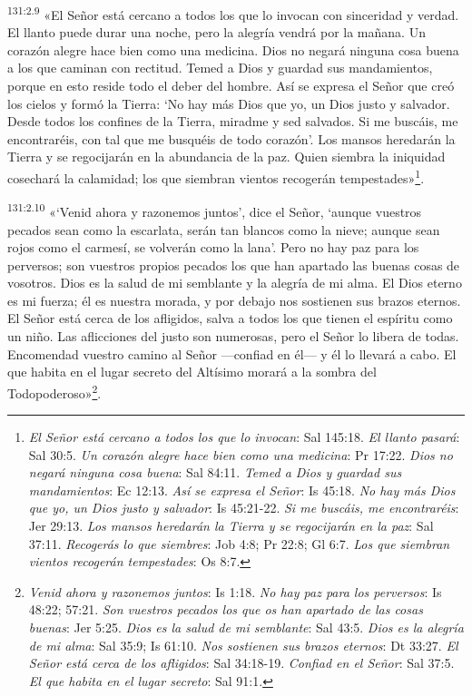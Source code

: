 \par
\textsuperscript{131:2.9} «El Señor está cercano a todos los que lo invocan con sinceridad y verdad. El llanto puede durar una noche, pero la alegría vendrá por la mañana. Un corazón alegre hace bien como una medicina. Dios no negará ninguna cosa buena a los que caminan con rectitud. Temed a Dios y guardad sus mandamientos, porque en esto reside todo el deber del hombre. Así se expresa el Señor que creó los cielos y formó la Tierra: `No hay más Dios que yo, un Dios justo y salvador. Desde todos los confines de la Tierra, miradme y sed salvados. Si me buscáis, me encontraréis, con tal que me busquéis de todo corazón'. Los mansos heredarán la Tierra y se regocijarán en la abundancia de la paz. Quien siembra la iniquidad cosechará la calamidad; los que siembran vientos recogerán tempestades»\footnote{\textit{El Señor está cercano a todos los que lo invocan}: Sal 145:18. \textit{El llanto pasará}: Sal 30:5. \textit{Un corazón alegre hace bien como una medicina}: Pr 17:22. \textit{Dios no negará ninguna cosa buena}: Sal 84:11. \textit{Temed a Dios y guardad sus mandamientos}: Ec 12:13. \textit{Así se expresa el Señor}: Is 45:18. \textit{No hay más Dios que yo, un Dios justo y salvador}: Is 45:21-22. \textit{Si me buscáis, me encontraréis}: Jer 29:13. \textit{Los mansos heredarán la Tierra y se regocijarán en la paz}: Sal 37:11. \textit{Recogerás lo que siembres}: Job 4:8; Pr 22:8; Gl 6:7. \textit{Los que siembran vientos recogerán tempestades}: Os 8:7.}.

\par
\textsuperscript{131:2.10} «`Venid ahora y razonemos juntos', dice el Señor, `aunque vuestros pecados sean como la escarlata, serán tan blancos como la nieve; aunque sean rojos como el carmesí, se volverán como la lana'. Pero no hay paz para los perversos; son vuestros propios pecados los que han apartado las buenas cosas de vosotros. Dios es la salud de mi semblante y la alegría de mi alma. El Dios eterno es mi fuerza; él es nuestra morada, y por debajo nos sostienen sus brazos eternos. El Señor está cerca de los afligidos, salva a todos los que tienen el espíritu como un niño. Las aflicciones del justo son numerosas, pero el Señor lo libera de todas. Encomendad vuestro camino al Señor ---confiad en él--- y él lo llevará a cabo. El que habita en el lugar secreto del Altísimo morará a la sombra del Todopoderoso»\footnote{\textit{Venid ahora y razonemos juntos}: Is 1:18. \textit{No hay paz para los perversos}: Is 48:22; 57:21. \textit{Son vuestros pecados los que os han apartado de las cosas buenas}: Jer 5:25. \textit{Dios es la salud de mi semblante}: Sal 43:5. \textit{Dios es la alegría de mi alma}: Sal 35:9; Is 61:10. \textit{Nos sostienen sus brazos eternos}: Dt 33:27. \textit{El Señor está cerca de los afligidos}: Sal 34:18-19. \textit{Confiad en el Señor}: Sal 37:5. \textit{El que habita en el lugar secreto}: Sal 91:1.}.

